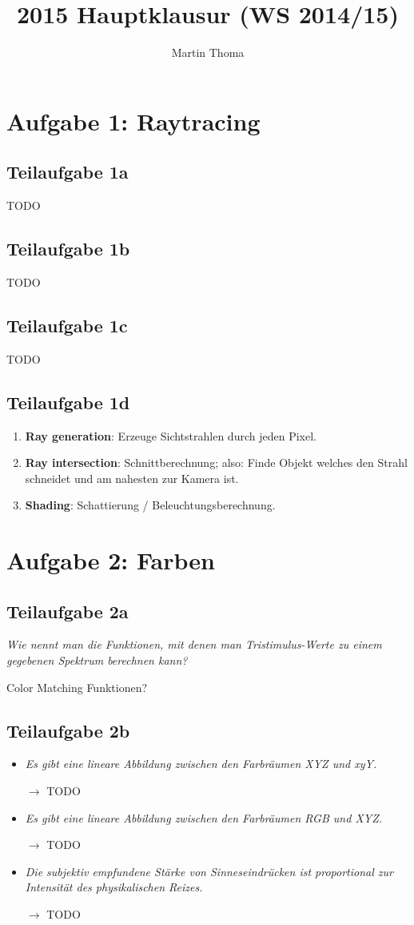\documentclass[a4paper]{scrartcl}
\begin{document}
\title{2015 Hauptklausur (WS 2014/15)}
\author{Martin Thoma}

\setcounter{section}{1}
\section*{Aufgabe 1: Raytracing}
\subsection*{Teilaufgabe 1a}
TODO
\subsection*{Teilaufgabe 1b}
TODO
\subsection*{Teilaufgabe 1c}
TODO
\subsection*{Teilaufgabe 1d}
\begin{enumerate}
    \item \textbf{Ray generation}: Erzeuge Sichtstrahlen durch jeden Pixel.
    \item \textbf{Ray intersection}: Schnittberechnung; also: Finde Objekt
          welches den Strahl schneidet und am nahesten zur Kamera ist.
    \item \textbf{Shading}: Schattierung / Beleuchtungsberechnung.
\end{enumerate}

\section*{Aufgabe 2: Farben}
\subsection*{Teilaufgabe 2a}
\textit{Wie nennt man die Funktionen, mit denen man Tristimulus-Werte zu einem gegebenen Spektrum berechnen kann?}

Color Matching Funktionen?

\subsection*{Teilaufgabe 2b}
\begin{itemize}
    \item \textit{Es gibt eine lineare Abbildung zwischen den Farbräumen XYZ und xyY.}
    \item[$\rightarrow$] TODO
    \item \textit{Es gibt eine lineare Abbildung zwischen den Farbräumen RGB und XYZ.}
    \item[$\rightarrow$] TODO
    \item \textit{Die subjektiv empfundene Stärke von Sinneseindrücken ist proportional zur Intensität des physikalischen Reizes.}
    \item[$\rightarrow$] TODO
\end{itemize}
\end{document}
